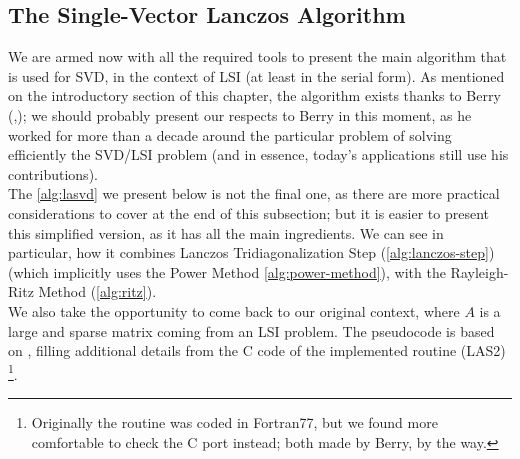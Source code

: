 \subsection{The Single-Vector Lanczos Algorithm}

We are armed now with all the required tools to present the main
algorithm that is used for SVD, in the context of LSI (at least in the
serial form). As mentioned on the introductory section of this
chapter, the algorithm exists thanks to Berry
(\cite{berry92},\cite{berry95}); we should probably present our
respects to Berry in this moment, as he worked for more than a decade
around the particular problem of solving efficiently the SVD/LSI
problem (and in essence, today's applications still use his
contributions). \\

The \cref{alg:lasvd} we present below is not the final one, as there are more
practical considerations to cover at the end of this subsection; but it is
easier to present this simplified version, as it has all the main
ingredients. We can see in particular, how it combines Lanczos
Tridiagonalization Step (\cref{alg:lanczos-step}) (which implicitly
uses the Power Method \cref{alg:power-method}), with the Rayleigh-Ritz
Method (\cref{alg:ritz}). \\

We also take the opportunity to come back to our original context,
where $A$ is a large and sparse matrix coming from an LSI problem. The
pseudocode is based on \cite{berry92}, filling additional details
from the C code of the implemented routine (LAS2) \footnote{Originally
the routine was coded in Fortran77, but we found more comfortable to
check the C port instead; both made by Berry, by the way.}.

